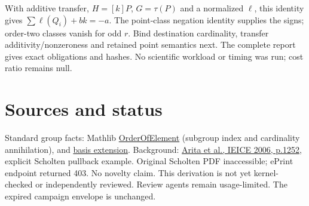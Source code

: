 \documentclass[10pt]{article}
\begin{document}
With additive transfer, $H=[k]P$, $G=\tau(P)$ and a normalized $\ell$, this identity gives $\sum\ell(Q_i)+bk=-a$. The point-class negation identity supplies the signs; order-two classes vanish for odd $r$. Bind destination cardinality, transfer additivity/nonzeroness and retained point semantics next. The complete report gives exact obligations and hashes. No scientific workload or timing was run; cost ratio remains null.
\section*{Sources and status}
Standard group facts: Mathlib \href{https://leanprover-community.github.io/mathlib4_docs/Mathlib/GroupTheory/OrderOfElement.html}{OrderOfElement} (subgroup index and cardinality annihilation), and \href{https://leanprover-community.github.io/mathlib4_docs/Mathlib/LinearAlgebra/Basis/VectorSpace.html}{basis extension}. Background: \href{https://kazutomatsuo.github.io/publications/pdf/e89-a_5_1246.pdf}{Arita et al., IEICE 2006, p.1252}, explicit Scholten pullback example. Original Scholten PDF inaccessible; ePrint endpoint returned 403. No novelty claim. This derivation is not yet kernel-checked or independently reviewed. Review agents remain usage-limited. The expired campaign envelope is unchanged.
\end{document}
